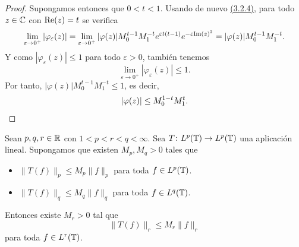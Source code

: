 \documentclass[a4paper, 12pt]{book}
\begin{document}
\begin{proof}
    Supongamos entonces que $0 < t < 1$. Usando de nuevo \hyperref[3.2.4]{(3.2.4)}, para todo $z \in \mathbb C$ con $\textup{Re}(z) = t$ se verifica
    \[\lim_{\varepsilon \to 0^+} |\varphi_\varepsilon(z)| = \lim_{\varepsilon \to 0^+}  |\varphi(z)|M_0^{t-1}M_1^{-t}e^{\varepsilon t(t-1)}e^{-\varepsilon \textup{Im}(z)^2} = |\varphi(z)|M_0^{t-1}M_1^{-t}.\]
    Y como $|\varphi_\varepsilon(z)| \leq 1$ para todo $\varepsilon > 0$, también tenemos
    \[\lim_{\varepsilon \to 0^+} |\varphi_\varepsilon(z)| \leq 1.\]
    Por tanto, $|\varphi(z)| M_0^{t-1}M_1^{-t} \leq 1$, es decir,
    \[|\varphi(z)| \leq M_0^{1-t}M_1^t. \qedhere\]
\end{proof}

\begin{theorem}\label{3.2.5}
    Sean $p,q,r\in{\mathbb R}$ con $1 < p < r < q < \infty$. Sea $T \colon L^{p}(\mathbb T) \to L^{p}(\mathbb T)$ una aplicación lineal. Supongamos que existen $M_p,M_q>0$ tales que
    \begin{itemize}
        \item $\|T(f)\|_{p} \leq M_p\|f\|_{p}$ para toda $f \in L^{p}(\mathbb T)$.
        \item $\|T(f)\|_{q} \leq M_q\|f\|_{q}$ para toda $f \in L^{q}(\mathbb T)$.
    \end{itemize}
    Entonces existe $M_r>0$ tal que
    \[\|T(f)\|_r \leq M_r\|f\|_r\]
    para toda $f \in L^r(\mathbb T)$.
\end{theorem}
\end{document}
